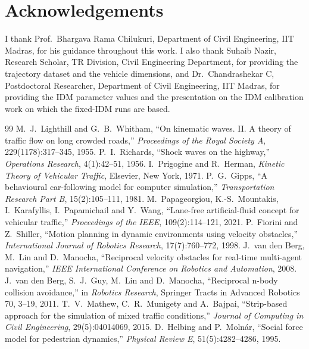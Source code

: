 \documentclass[11pt]{article}
\begin{document}
\section*{Acknowledgements}
I thank Prof.\ Bhargava Rama Chilukuri, Department of Civil Engineering, IIT
Madras, for his guidance throughout this work. I also thank Suhaib Nazir,
Research Scholar, TR Division, Civil Engineering Department, for providing the
trajectory dataset and the vehicle dimensions, and Dr.\ Chandrashekar C,
Postdoctoral Researcher, Department of Civil Engineering, IIT Madras, for
providing the IDM parameter values and the presentation on the IDM calibration
work on which the fixed-IDM runs are based.
\begin{thebibliography}{99}
 M.~J.~Lighthill and G.~B.~Whitham, ``On kinematic waves. II. A
theory of traffic flow on long crowded roads,'' \emph{Proceedings of the Royal
Society A}, 229(1178):317--345, 1955.
 P.~I.~Richards, ``Shock waves on the highway,''
\emph{Operations Research}, 4(1):42--51, 1956.
 I.~Prigogine and R.~Herman, \emph{Kinetic Theory of Vehicular
Traffic}, Elsevier, New York, 1971.
 P.~G.~Gipps, ``A behavioural car-following model for computer
simulation,'' \emph{Transportation Research Part B}, 15(2):105--111, 1981.
 M.~Papageorgiou, K.-S.~Mountakis, I.~Karafyllis,
I.~Papamichail and Y.~Wang, ``Lane-free artificial-fluid concept for vehicular
traffic,'' \emph{Proceedings of the IEEE}, 109(2):114--121, 2021.
 P.~Fiorini and Z.~Shiller, ``Motion planning in dynamic
environments using velocity obstacles,'' \emph{International Journal of Robotics
Research}, 17(7):760--772, 1998.
 J.~van den Berg, M.~Lin and D.~Manocha, ``Reciprocal velocity
obstacles for real-time multi-agent navigation,'' \emph{IEEE International
Conference on Robotics and Automation}, 2008.
 J.~van den Berg, S.~J.~Guy, M.~Lin and D.~Manocha, ``Reciprocal
n-body collision avoidance,'' in \emph{Robotics Research}, Springer Tracts in
Advanced Robotics 70, 3--19, 2011.
 T.~V.~Mathew, C.~R.~Munigety and A.~Bajpai, ``Strip-based
approach for the simulation of mixed traffic conditions,'' \emph{Journal of
Computing in Civil Engineering}, 29(5):04014069, 2015.
 D.~Helbing and P.~Moln\'ar, ``Social force model for pedestrian
dynamics,'' \emph{Physical Review E}, 51(5):4282--4286, 1995.

\end{thebibliography}
\end{document}
